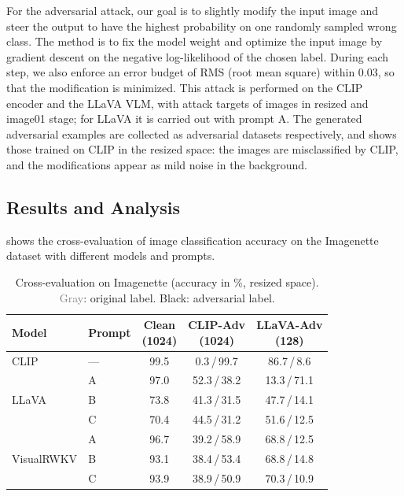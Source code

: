 \documentclass[conference]{IEEEtran}
\newcommand{\cell}[2]{{\color{gray}#1}\,/\,#2}
\newcommand{\ccell}[1]{{\color{gray}#1}}
\newcommand{\tabcap}[1]{\caption{\normalfont #1}}
\begin{document}
For the adversarial attack, our goal is to slightly modify the input image
and steer the output to have the highest probability on one randomly
sampled wrong class. The method is to fix the model weight and optimize the
input image by gradient descent on the negative log-likelihood of the
chosen label. During each step, we also enforce an error budget of RMS
(root mean square) within 0.03, so that the modification is minimized. This attack is performed on the CLIP encoder and the LLaVA VLM, with attack
targets of images in resized and image01 stage; for LLaVA it is carried out
with prompt A. The generated adversarial examples are collected as
adversarial datasets respectively, and  shows those
trained on CLIP in the resized space: the images are misclassified by CLIP,
and the modifications appear as mild noise in the background.

\subsection{Results and Analysis}

 shows the cross-evaluation of image classification
accuracy on the Imagenette dataset with different models and prompts.

\begin{table}[t]
  \centering
  \tabcap{Cross-evaluation on Imagenette (accuracy in \%, resized space).
  \textcolor{gray}{Gray}: original label. Black: adversarial label.}
  \label{tab:xeval}
  \footnotesize
  \setlength{\tabcolsep}{4pt}
  \begin{tabular}{@{}l@{~}l ccc@{}}
    \toprule
    Model & Prompt & \shortstack{Clean\\(1024)} & \shortstack{CLIP-Adv\\(1024)} & \shortstack{LLaVA-Adv\\(128)} \\
    \midrule
    CLIP & --- & \ccell{99.5} & \cell{0.3}{99.7} & \cell{86.7}{8.6} \\
    \midrule
    \multirow{3}{*}{LLaVA}
      & A & \ccell{97.0} & \cell{52.3}{38.2} & \cell{13.3}{71.1} \\
      & B & \ccell{73.8} & \cell{41.3}{31.5} & \cell{47.7}{14.1} \\
      & C & \ccell{70.4} & \cell{44.5}{31.2} & \cell{51.6}{12.5} \\
    \midrule
    \multirow{3}{*}{VisualRWKV}
      & A & \ccell{96.7} & \cell{39.2}{58.9} & \cell{68.8}{12.5} \\
      & B & \ccell{93.1} & \cell{38.4}{53.4} & \cell{68.8}{14.8} \\
      & C & \ccell{93.9} & \cell{38.9}{50.9} & \cell{70.3}{10.9} \\
    \bottomrule
  \end{tabular}
\end{table}
\end{document}
